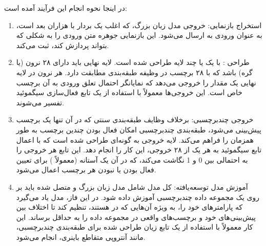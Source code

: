 در اینجا نحوه انجام این فرآیند آمده است:
\begin{enumerate}
	\item
	      استخراج بازنمایی: خروجی مدل زبان بزرگ، که اغلب یک بردار با هزاران بعد است، به عنوان ورودی به  ارسال می‌شود. این بازنمایی جوهره متن ورودی را به شکلی که  بتواند پردازش کند، ثبت می‌کند.
	\item
	      طراحی :  با یک یا چند لایه طراحی شده است. لایه نهایی  باید دارای ۲۸ نرون (یا گره) باشد که با ۲۸ برچسب در وظیفه طبقه‌بندی مطابقت دارد. هر نرون در لایه نهایی یک مقدار را خروجی می‌دهد که نمایانگر احتمال تعلق ورودی به آن برچسب خاص است. این خروجی‌ها معمولاً با استفاده از یک تابع فعال‌سازی سیگموئید تفسیر می‌شوند.

	\item
	      خروجی چند‌برچسبی: برخلاف وظایف طبقه‌بندی سنتی که در آن تنها یک برچسب پیش‌بینی می‌شود، طبقه‌بندی چند‌برچسبی امکان فعال بودن چندین برچسب به طور همزمان را فراهم می‌کند. لایه خروجی  به گونه‌ای طراحی شده است که با اعمال تابع سیگموئید به هر یک از ۲۸ خروجی، این کار را انجام دهد. این تابع هر خروجی را به احتمالی بین 0 و 1 نگاشت می‌کند، که در آن یک آستانه (معمولاً ) برای تعیین فعال بودن یا نبودن هر برچسب اعمال می‌شود.

	\item
	      آموزش مدل توسعه‌یافته: کل مدل شامل مدل زبان بزرگ و  متصل شده باید بر روی یک مجموعه داده چندبرچسبی آموزش داده شود. در این فاز، مدل یاد می‌گیرد که پارامترهای خود را، به ویژه آن‌هایی که در  هستند، تنظیم کند تا اختلاف بین پیش‌بینی‌های خود و برچسب‌های واقعی در مجموعه داده را به حداقل برساند. این کار معمولاً با استفاده از یک تابع زیان طراحی شده برای طبقه‌بندی چندبرچسبی، مانند آنتروپی متقاطع باینری، انجام می‌شود.
\end{enumerate}

